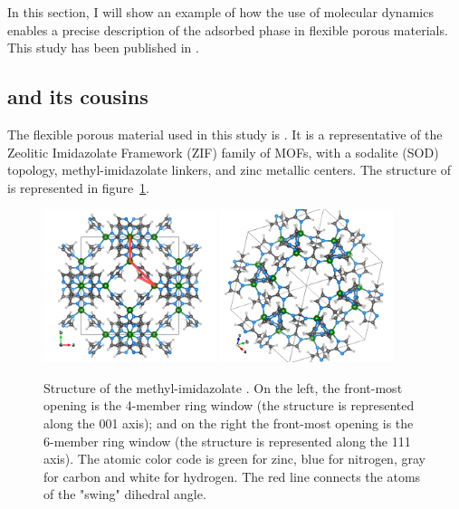 \documentclass[thesis]{subfiles}
\begin{document}
In this section, I will show an example of how the use of \abinitio molecular
dynamics enables a precise description of the adsorbed phase in flexible porous
materials. This study has been published in \cite{Chaplais2018}.

\subsection{ and its cousins}

The flexible porous material used in this study is . It is a representative
of the Zeolitic Imidazolate Framework (ZIF) family of MOFs, with a sodalite
(SOD) topology, methyl-imidazolate linkers, and zinc metallic centers. The
structure of  is represented in figure~\ref{fig:zif8-ch3:structure}.

\begin{figure}[ht]
    \centering
    \includegraphics[width=0.45\textwidth]{figures/images/swing-angle}
    \hfill
    \includegraphics[width=0.45\textwidth]{figures/images/ZIF8-111}
    \caption{Structure of the methyl-imidazolate . On the left, the
    front-most opening is the 4-member ring window (the structure is represented
    along the 001 axis); and on the right the front-most opening is the 6-member
    ring window (the structure is represented along the 111 axis). The atomic
    color code is green for zinc, blue for nitrogen, gray for carbon and white
    for hydrogen. The red line connects the atoms of the "swing"
     dihedral angle.}
    \label{fig:zif8-ch3:structure}
\end{figure}
\end{document}
